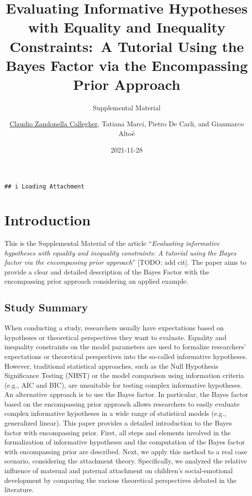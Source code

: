 \documentclass[
]{book}
\title{Evaluating Informative Hypotheses with Equality and Inequality Constraints:~A Tutorial Using the Bayes Factor via the Encompassing Prior Approach}
\subtitle{Supplemental Material}
\author{\href{https://claudiozandonella.netlify.app/}{Claudio Zandonella Callegher}, Tatiana Marci, Pietro De Carli, and Gianmarco Altoè}
\date{2021-11-28}
\begin{document}
\maketitle

{
\setcounter{tocdepth}{1}
\tableofcontents
}
\begin{verbatim}
## i Loading Attachment
\end{verbatim}

\hypertarget{introduction}{%
\chapter*{Introduction}\label{introduction}}

This is the Supplemental Material of the article ``\emph{Evaluating informative hypotheses with equality and inequality constraints: A tutorial using the Bayes factor via the encompassing prior approach}'' {[}TODO: add cit{]}. The paper aims to provide a clear and detailed description of the Bayes Factor with the encompassing prior approach considering an applied example.

\hypertarget{study-summary}{%
\section*{Study Summary}\label{study-summary}}

When conducting a study, researchers usually have expectations based on hypotheses or theoretical perspectives they want to evaluate. Equality and inequality constraints on the model parameters are used to formalize researchers' expectations or theoretical perspectives into the so-called informative hypotheses. However, traditional statistical approaches, such as the Null Hypothesis Significance Testing (NHST) or the model comparison using information criteria (e.g., AIC and BIC), are unsuitable for testing complex informative hypotheses. An alternative approach is to use the Bayes factor. In particular, the Bayes factor based on the encompassing prior approach allows researchers to easily evaluate complex informative hypotheses in a wide range of statistical models (e.g., generalized linear). This paper provides a detailed introduction to the Bayes factor with encompassing prior. First, all steps and elements involved in the formalization of informative hypotheses and the computation of the Bayes factor with encompassing prior are described. Next, we apply this method to a real case scenario, considering the attachment theory. Specifically, we analyzed the relative influence of maternal and paternal attachment on children's social-emotional development by comparing the various theoretical perspectives debated in the literature.
\end{document}
